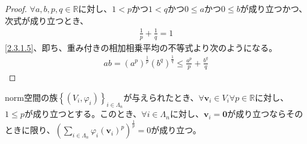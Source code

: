 \documentclass[dvipdfmx]{jsarticle}
\begin{document}
\begin{proof}
$\forall a,b,p,q \in \mathbb{R}$に対し、$1 < p$かつ$1 < q$かつ$0 \leq a$かつ$0 \leq b$が成り立つかつ、次式が成り立つとき、
\begin{align*}
\frac{1}{p} + \frac{1}{q} = 1
\end{align*}
\ref{2.3.1.5}、即ち、重み付きの相加相乗平均の不等式より次のようになる。
\begin{align*}
ab = \left( a^{p} \right)^{\frac{1}{p}}\left( b^{q} \right)^{\frac{1}{q}} \leq \frac{a^{p}}{p} + \frac{b^{q}}{q}
\end{align*}
\end{proof}
\begin{thm}\label{2.3.1.7}
norm空間の族$\left\{ \left( V_{i},\varphi_{i} \right) \right\}_{i \in \varLambda_{n}}$が与えられたとき、$\forall\mathbf{v}_{i} \in V_{i}\forall p \in \mathbb{R}$に対し、$1 \leq p$が成り立つとする。このとき、$\forall i \in \varLambda_{n}$に対し、$\mathbf{v}_{i} = \mathbf{0}$が成り立つならそのときに限り、$\left( \sum_{i \in \varLambda_{n}} {\varphi_{i}\left( \mathbf{v}_{i} \right)}^{p} \right)^{\frac{1}{p}} = 0$が成り立つ。
\end{thm}
\end{document}
